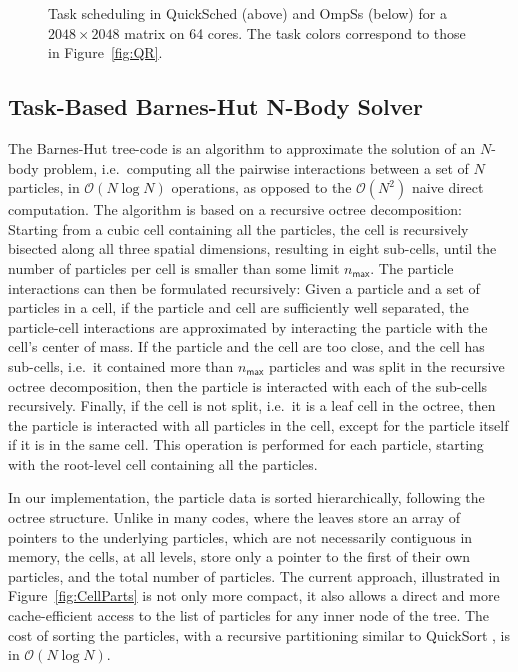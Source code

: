 \documentclass[fleqn,10pt]{wlpeerj}
\newcommand{\oh}[1]
    {\mbox{$ {\mathcal O}( #1 ) $}}
\newcommand{\fig}[1]
    {Figure~\ref{fig:#1}}
\begin{document}
\begin{figure}
    \centerline{}
    \centerline{}
    \caption{Task scheduling in QuickSched (above) and OmpSs (below)
        for a $2048\times 2048$ matrix on 64 cores.
        The task colors correspond to those in \fig{QR}.}
    \label{fig:QRTasks}
\end{figure}


\subsection{Task-Based Barnes-Hut N-Body Solver}

The Barnes-Hut tree-code \citep{ref:Barnes1986}
is an algorithm to approximate the
solution of an $N$-body problem, i.e.~computing all the
pairwise interactions between a set of $N$ particles,
in \oh{N\log N} operations, as opposed to the \oh{N^2}
naive direct computation.
The algorithm is based on a recursive octree decomposition:
Starting from a cubic cell containing all the particles,
the cell is recursively bisected along all three spatial dimensions,
resulting in eight sub-cells, until the number of particles
per cell is smaller than some limit $n_\mathsf{max}$.
The particle interactions can then be formulated recursively:
Given a particle and a set of particles in a cell,
if the particle and cell
are sufficiently well separated, the particle-cell interactions
are approximated by interacting the particle with the cell's
center of mass.
If the particle and the cell are too close, and the cell
has sub-cells, i.e.~it contained more than $n_\mathsf{max}$
particles and was split in the recursive octree decomposition,
then the particle is interacted with each of the sub-cells
recursively.
Finally, if the cell is not split, i.e.~it is a leaf cell
in the octree, then the particle is interacted with all
particles in the cell, except for the particle itself if
it is in the same cell.
This operation is performed for each particle, starting
with the root-level cell containing all the particles.

In our implementation, the particle data is sorted hierarchically,
following the octree structure.
Unlike in many codes, where the leaves store an array of
pointers to the underlying particles, which are not necessarily
contiguous in memory, the cells, at all
levels, store only a pointer to the first of their own particles,
and the total number of particles.
The current approach, illustrated in \fig{CellParts} is not
only more compact, it also allows a direct and more cache-efficient access
to the list of particles for any inner node of the tree.
The cost of sorting the particles, with a recursive
partitioning similar to QuickSort \citep{ref:Hoare1962},
is in \oh{N\log N}.
\end{document}
